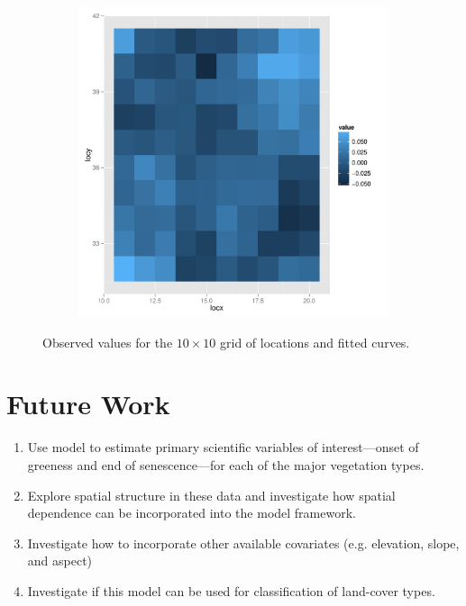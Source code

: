 \begin{figure}
\begin{subfigure}[b]{0.3\textwidth}
        \end{subfigure}
          \begin{subfigure}[b]{0.3\textwidth}
                \centering
                \includegraphics[width=\textwidth]{Images-future-work/coef5-spatial.pdf}
        \end{subfigure}
        \caption{Observed values for the $10\times 10$ grid of locations and fitted curves.}
        \label{fig:estimated curves}
\end{figure}





\newpage
\section{Future Work}
\begin{enumerate}
\item Use model to estimate primary scientific variables of interest---onset of greeness and end of senescence---for each of the major vegetation types.
\item Explore spatial structure in these data and investigate how spatial dependence can be incorporated into the model framework.
\item Investigate how to incorporate other available covariates (e.g. elevation, slope, and aspect)
\item Investigate if this model can be used for classification of land-cover types.
\end{enumerate}

